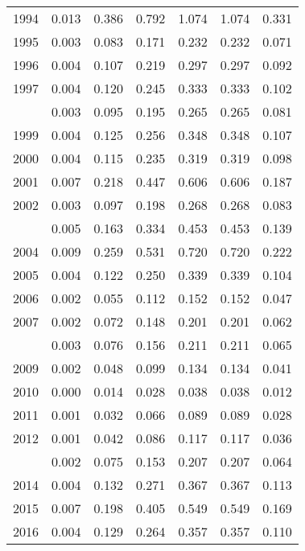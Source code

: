\documentclass[
]{article}
\begin{document}
\begin{longtable}[t]{lrrrrrr}
1994 & 0.013 & 0.386 & 0.792 & 1.074 & 1.074 & 0.331\\
1995 & 0.003 & 0.083 & 0.171 & 0.232 & 0.232 & 0.071\\
1996 & 0.004 & 0.107 & 0.219 & 0.297 & 0.297 & 0.092\\
1997 & 0.004 & 0.120 & 0.245 & 0.333 & 0.333 & 0.102\\
\addlinespace
1998 & 0.003 & 0.095 & 0.195 & 0.265 & 0.265 & 0.081\\
1999 & 0.004 & 0.125 & 0.256 & 0.348 & 0.348 & 0.107\\
2000 & 0.004 & 0.115 & 0.235 & 0.319 & 0.319 & 0.098\\
2001 & 0.007 & 0.218 & 0.447 & 0.606 & 0.606 & 0.187\\
2002 & 0.003 & 0.097 & 0.198 & 0.268 & 0.268 & 0.083\\
\addlinespace
2003 & 0.005 & 0.163 & 0.334 & 0.453 & 0.453 & 0.139\\
2004 & 0.009 & 0.259 & 0.531 & 0.720 & 0.720 & 0.222\\
2005 & 0.004 & 0.122 & 0.250 & 0.339 & 0.339 & 0.104\\
2006 & 0.002 & 0.055 & 0.112 & 0.152 & 0.152 & 0.047\\
2007 & 0.002 & 0.072 & 0.148 & 0.201 & 0.201 & 0.062\\
\addlinespace
2008 & 0.003 & 0.076 & 0.156 & 0.211 & 0.211 & 0.065\\
2009 & 0.002 & 0.048 & 0.099 & 0.134 & 0.134 & 0.041\\
2010 & 0.000 & 0.014 & 0.028 & 0.038 & 0.038 & 0.012\\
2011 & 0.001 & 0.032 & 0.066 & 0.089 & 0.089 & 0.028\\
2012 & 0.001 & 0.042 & 0.086 & 0.117 & 0.117 & 0.036\\
\addlinespace
2013 & 0.002 & 0.075 & 0.153 & 0.207 & 0.207 & 0.064\\
2014 & 0.004 & 0.132 & 0.271 & 0.367 & 0.367 & 0.113\\
2015 & 0.007 & 0.198 & 0.405 & 0.549 & 0.549 & 0.169\\
2016 & 0.004 & 0.129 & 0.264 & 0.357 & 0.357 & 0.110\\*
\end{longtable}
\end{document}

